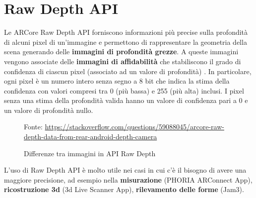 \documentclass[crop=false, class=book]{standalone}
\begin{document}
		\section{Raw Depth API}
		Le ARCore Raw Depth API forniscono informazioni più precise sulla profondità di alcuni pixel di un'immagine e 					permettono di rappresentare la geometria della scena generando delle \textbf{immagini di profondità grezze}. A 					queste immagini vengono associate delle \textbf{immagini di affidabilità} che stabiliscono il grado di confidenza di 			ciascun pixel (associato ad un valore di profondità) \cite{mobilear2021rawdepth}. In particolare, ogni pixel è un 				numero intero senza segno a 8 bit che indica la stima della confidenza con valori compresi tra 0 (più bassa) e 					255 (più alta) inclusi. I pixel senza una stima della profondità valida hanno un valore di confidenza pari a 0 e un 			valore di profondità nullo.
		
		\begin{figure}
				\centering
				{Fonte: \url{https://stackoverflow.com/questions/59088045/arcore-raw-depth-data-from-rear-android-depth-camera}}
				\caption{Differenze tra immagini in API Raw Depth }
				\label{fig: depth-raw-api}
		\end{figure}
		
		\begin{flushleft}
			L'uso di Raw Depth API è molto utile nei casi in cui c'è il bisogno di avere una maggiore precisione, ad esempio 				nella \textbf{misurazione} (PHORIA ARConnect App), \textbf{ricostruzione 3d}  (3d Live Scanner App), \textbf{rilevamento delle forme} (Jam3).
			
		\end{flushleft}
		
\end{document}
